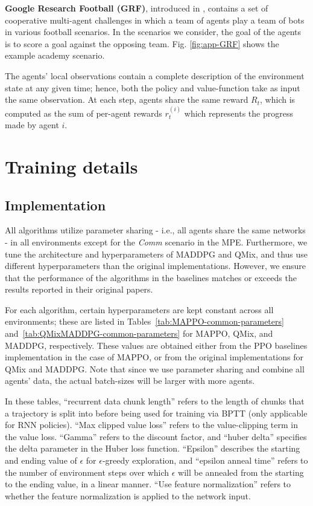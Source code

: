 \textbf{Google Research Football (GRF)}, introduced in \cite{kurach2020google}, contains a set of cooperative multi-agent challenges in which a team of agents play a team of bots in various football scenarios. In the scenarios we consider, the goal of the agents is to score a goal against the opposing team. Fig. \ref{fig:app-GRF} shows the example academy scenario. 

The agents' local observations contain a complete description of the environment state at any given time; hence, both the policy and value-function take as input the same observation. At each step, agents share the same reward $R_t$, which is computed as the sum of per-agent rewards $r^{(i)}_t$ which represents the progress made by agent $i$.

\section{Training details} \label{app:training}
\label{app:training-details}
\subsection{Implementation}
\label{app:imple}

\label{app:mappo-imple}
All algorithms utilize parameter sharing - i.e., all agents share the same networks - in all environments except for the \textit{Comm} scenario in the MPE. Furthermore, we tune the architecture and hyperparameters of MADDPG and QMix, and thus use different hyperparameters than the original implementations. However, we ensure that the performance of the algorithms in the baselines matches or exceeds the results reported in their original papers. 

For each algorithm, certain hyperparameters are kept constant across all environments; these are listed in Tables~\ref{tab:MAPPO-common-parameters} and~\ref{tab:QMixMADDPG-common-parameters} for MAPPO, QMix, and MADDPG, respectively. These values are obtained either from the PPO baselines implementation in the case of MAPPO, or from the original implementations for QMix and MADDPG. Note that since we use parameter sharing and combine all agents' data, the actual batch-sizes will be larger with more agents. 

In these tables, ``recurrent data chunk length'' refers to the length of chunks that a trajectory is split into before being used for training via BPTT (only applicable for RNN policies). ``Max clipped value loss'' refers to the value-clipping term in the value loss. ``Gamma'' refers to the discount factor, and ``huber delta'' specifies the delta parameter in the Huber loss function. ``Epsilon'' describes the starting and ending value of $\epsilon$ for $\epsilon$-greedy exploration, and ``epsilon anneal time'' refers to the number of environment steps over which $\epsilon$ will be annealed from the starting to the ending value, in a linear manner. ``Use feature normalization'' refers to whether the feature normalization is applied to the network input.

